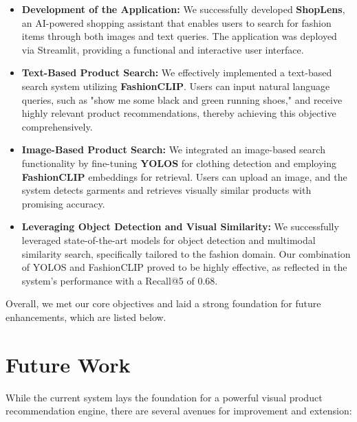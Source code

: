 \begin{itemize}
    \item \textbf{Development of the Application:} We successfully developed \textbf{ShopLens}, an AI-powered shopping assistant that enables users to search for fashion items through both images and text queries. The application was deployed via Streamlit, providing a functional and interactive user interface.

    \item \textbf{Text-Based Product Search:} We effectively implemented a text-based search system utilizing \textbf{FashionCLIP}. Users can input natural language queries, such as "show me some black and green running shoes," and receive highly relevant product recommendations, thereby achieving this objective comprehensively.

    \item \textbf{Image-Based Product Search:} We integrated an image-based search functionality by fine-tuning \textbf{YOLOS} for clothing detection and employing \textbf{FashionCLIP} embeddings for retrieval. Users can upload an image, and the system detects garments and retrieves visually similar products with promising accuracy.

    \item \textbf{Leveraging Object Detection and Visual Similarity:} We successfully leveraged state-of-the-art models for object detection and multimodal similarity search, specifically tailored to the fashion domain. Our combination of YOLOS and FashionCLIP proved to be highly effective, as reflected in the system’s performance with a Recall@5 of 0.68.
\end{itemize}

Overall, we met our core objectives and laid a strong foundation for future enhancements, which are listed below.


\section{Future Work}

While the current system lays the foundation for a powerful visual product recommendation engine, there are several avenues for improvement and extension:

